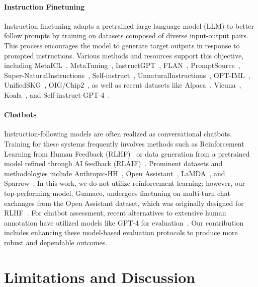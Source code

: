 \paragraph{Instruction Finetuning} Instruction finetuning adapts a pretrained large language model (LLM) to better follow prompts by training on datasets composed of diverse input-output pairs. This process encourages the model to generate target outputs in response to prompted instructions. Various methods and resources support this objective, including MetaICL~\citep{min2021metaicl}, MetaTuning~\citep{zhong2021adapting}, InstructGPT~\citep{ouyang2022training}, FLAN~\citep{wei2021finetuned,chung2022scaling}, PromptSource~\citep{bach2022promptsource}, Super-NaturalInstructions~\citep{wang2022super,sanh2021multitask}, Self-instruct~\citep{wang2022self}, UnnaturalInstructions~\citep{honovich2022unnatural}, OPT-IML~\citep{iyer2022opt}, UnifiedSKG~\citep{xie2022unifiedskg}, OIG/Chip2~\citep{laion2023}, as well as recent datasets like Alpaca~\citep{alpaca}, Vicuna~\citep{vicuna2023}, Koala~\citep{koala_blogpost_2023}, and Self-instruct-GPT-4~\citep{peng2023instruction}.

\paragraph{Chatbots} Instruction-following models are often realized as conversational chatbots. Training for these systems frequently involves methods such as Reinforcement Learning from Human Feedback (RLHF)~\citep{christiano2017deep} or data generation from a pretrained model refined through AI feedback (RLAIF)~\citep{bai2022constitutional}. Prominent datasets and methodologies include Anthropic-HH~\citep{askell2021general,bai2022training}, Open Assistant~\citep{kopf2023openassistant}, LaMDA~\citep{thoppilan2022lamda}, and Sparrow~\citep{glaese2022improving}. In this work, we do not utilize reinforcement learning; however, our top-performing model, Guanaco, undergoes finetuning on multi-turn chat exchanges from the Open Assistant dataset, which was originally designed for RLHF~\citep{kopf2023openassistant}. For chatbot assessment, recent alternatives to extensive human annotation have utilized models like GPT-4 for evaluation~\citep{vicuna2023,peng2023instruction}. Our contribution includes enhancing these model-based evaluation protocols to produce more robust and dependable outcomes.

\section{Limitations and Discussion}

